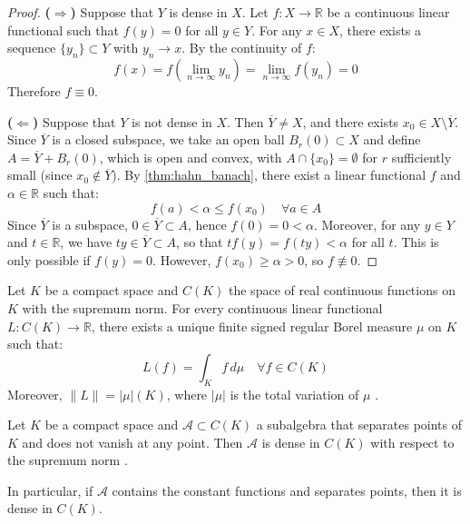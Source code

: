 \begin{proof}
	\textbf{(\(\Rightarrow\))} Suppose that $Y$ is dense in $X$. Let $f: X \to \mathbb{R}$ be a continuous linear functional such that $f(y) = 0$ for all $y \in Y$. For any $x \in X$, there exists a sequence $\{y_n\} \subset Y$ with $y_n \to x$. By the continuity of $f$:
	\[
		f(x) = f\!\left(\lim_{n \to \infty} y_n\right) = \lim_{n \to \infty} f(y_n) = 0
	\]
	Therefore $f \equiv 0$.

	\textbf{(\(\Leftarrow\))} Suppose that $Y$ is not dense in $X$. Then $\overline{Y} \neq X$, and there exists $x_0 \in X \setminus \overline{Y}$. Since $\overline{Y}$ is a closed subspace, we take an open ball $B_r(0) \subset X$ and define $A = \overline{Y} + B_r(0)$, which is open and convex, with $A \cap \{x_0\} = \emptyset$ for $r$ sufficiently small (since $x_0 \notin \overline{Y}$). By \autoref{thm:hahn_banach}, there exist a linear functional $f$ and $\alpha \in \mathbb{R}$ such that:
	\[
		f(a) < \alpha \leq f(x_0) \quad \forall a \in A
	\]
	Since $\overline{Y}$ is a subspace, $0 \in \overline{Y} \subset A$, hence $f(0) = 0 < \alpha$. Moreover, for any $y \in Y$ and $t \in \mathbb{R}$, we have $ty \in \overline{Y} \subset A$, so that $tf(y) = f(ty) < \alpha$ for all $t$. This is only possible if $f(y) = 0$. However, $f(x_0) \geq \alpha > 0$, so $f \not\equiv 0$.
\end{proof}

\begin{theorem}\label{thm:riesz_representacion}
	Let \(K\) be a compact space and \(C(K)\) the space of real continuous functions on \(K\) with the supremum norm. For every continuous linear functional \(L: C(K) \to \mathbb{R}\), there exists a unique finite signed regular Borel measure \(\mu\) on \(K\) such that:
	\[
		L(f) = \int_K f \, d\mu \quad \forall f \in C(K)
	\]
	Moreover, \(\|L\| = |\mu|(K)\), where \(|\mu|\) is the total variation of \(\mu\) \citep[Theorem~7.17]{Folland1999}.
\end{theorem}

\begin{theorem}\label{thm:stone_weierstrass}
	Let \(K\) be a compact space and \(\mathcal{A} \subset C(K)\) a subalgebra that separates points of \(K\) and does not vanish at any point. Then \(\mathcal{A}\) is dense in \(C(K)\) with respect to the supremum norm \citep[Theorem~7.32]{Rudin1976}.
\end{theorem}

In particular, if \(\mathcal{A}\) contains the constant functions and separates points, then it is dense in \(C(K)\).

